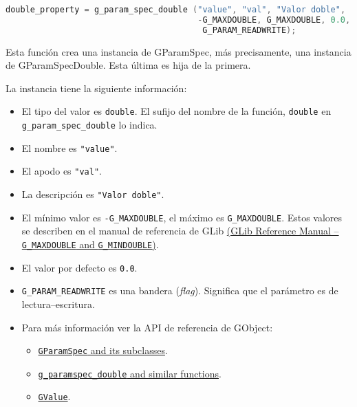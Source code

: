 \begin{lstlisting}[language=C]
double_property = g_param_spec_double ("value", "val", "Valor doble",
                                       -G_MAXDOUBLE, G_MAXDOUBLE, 0.0,
                                        G_PARAM_READWRITE);
\end{lstlisting}

Esta función crea una instancia de \textsf{GParamSpec}, más precisamente, una instancia
de \textsf{GParamSpecDouble}. Esta última es hija de la primera.

La instancia tiene la siguiente información:
\vspace{-\topsep}
\begin{itemize}
  \tightlist
\item El tipo del valor es \texttt{double}. El sufijo del nombre de la función,
  \texttt{double} en \texttt{g\_param\_spec\_double} lo indica.
\item El nombre es \texttt{"value"}.
\item El apodo es \texttt{"val"}.
\item La descripción es \texttt{"Valor doble"}.
\item El mínimo valor es \texttt{-G\_MAXDOUBLE}, el máximo es \texttt{G\_MAXDOUBLE}.
  Estos valores se describen en el manual de referencia de GLib
  \href{https://docs.gtk.org/glib/types.html#gdouble}{(GLib Reference Manual -- \texttt{G\_MAXDOUBLE} and \texttt{G\_MINDOUBLE})}.
\item El valor por defecto es \texttt{0.0}.
\item \texttt{G\_PARAM\_READWRITE} es una bandera (\emph{flag}). Significa que el
  parámetro es de lectura--escritura.
\item Para más información ver la API de referencia de \textsf{GObject}:
  \vspace{-\topsep}
  \vspace{0.8ex}
  \begin{itemize}
    \tightlist
  \item \href{https://docs.gtk.org/gobject/index.html#classes}
    {\texttt{GParamSpec} and its subclasses}.
  \item \href{https://docs.gtk.org/gobject/index.html#functions}
    {\texttt{g\_paramspec\_double} and similar functions}.
  \item \href{https://docs.gtk.org/gobject/struct.Value.html}
    {\texttt{GValue}}.
  \end{itemize}
\end{itemize}

